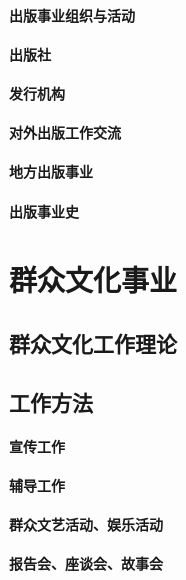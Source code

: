 \documentclass[UTF8]{../../ApplicationUniverse}
\begin{document}
        \subsubsection{出版事业组织与活动}
        \subsubsection{出版社}
        \subsubsection{发行机构}
        \subsubsection{对外出版工作交流}
        \subsubsection{地方出版事业}
        \subsubsection{出版事业史}






\chapter{群众文化事业}
\section{群众文化工作理论}
\section{工作方法}
    \subsubsection{宣传工作}
    \subsubsection{辅导工作}
    \subsubsection{群众文艺活动、娱乐活动}
    \subsubsection{报告会、座谈会、故事会}
\end{document}
